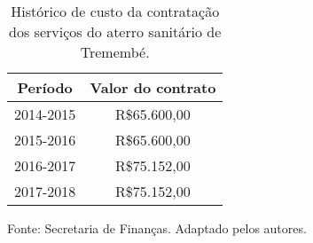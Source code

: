 \begin{table}[htbp]
\begin{center}
\caption{Histórico de custo da contratação dos serviços do aterro sanitário de Tremembé.}
	\begin{tabular}{c|c}
	\rowcolor[rgb]{ .969,  .588,  .275} \textbf{Período} & \textbf{Valor do contrato} \\
	\midrule
	\rowcolor[rgb]{ .992,  .914,  .851} 2014-2015 & R\$65.600,00 \\
	\midrule
	\rowcolor[rgb]{ .976,  .737,  .541} 2015-2016 & R\$65.600,00 \\
	\midrule
	\rowcolor[rgb]{ .992,  .914,  .851} 2016-2017 & R\$75.152,00 \\
	\midrule
	\rowcolor[rgb]{ .976,  .737,  .541} 2017-2018 & R\$75.152,00 \\
\end{tabular}%

\label{tab:historico_custo}
Fonte: Secretaria de Finanças. Adaptado pelos autores.
\end{center}
\end{table}
